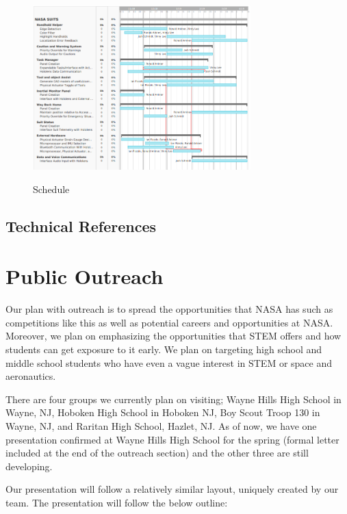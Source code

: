 \documentclass{article}
\let\Oldsection\section
\renewcommand{\section}{\FloatBarrier\Oldsection}
\let\Oldsubsection\subsection
\renewcommand{\subsection}{\FloatBarrier\Oldsubsection}
\begin{document}
\begin{figure}[!htb]
  \centering
  \caption{Schedule}
  \includegraphics[width=0.75\textwidth]{assets/supertaskschedule.png}
  \label{fig:supertaskschedule}
\end{figure}

\subsection{Technical References}

\printbibliography

\newpage

\section{Public Outreach}

Our plan with outreach is to spread the opportunities that NASA has such as competitions like this as well as potential careers and opportunities at NASA. Moreover, we plan on emphasizing the opportunities that STEM offers and how students can get exposure to it early. We plan on targeting high school and middle school students who have even a vague interest in STEM or space and aeronautics.

There are four groups we currently plan on visiting; Wayne Hills High School in Wayne, NJ, Hoboken High School in Hoboken NJ, Boy Scout Troop 130 in Wayne, NJ, and Raritan High School, Hazlet, NJ. As of now, we have one presentation confirmed at Wayne Hills High School for the spring (formal letter included at the end of the outreach section) and the other three are still developing.

Our presentation will follow a relatively similar layout, uniquely created by our team. The presentation will follow the below outline:
\end{document}
